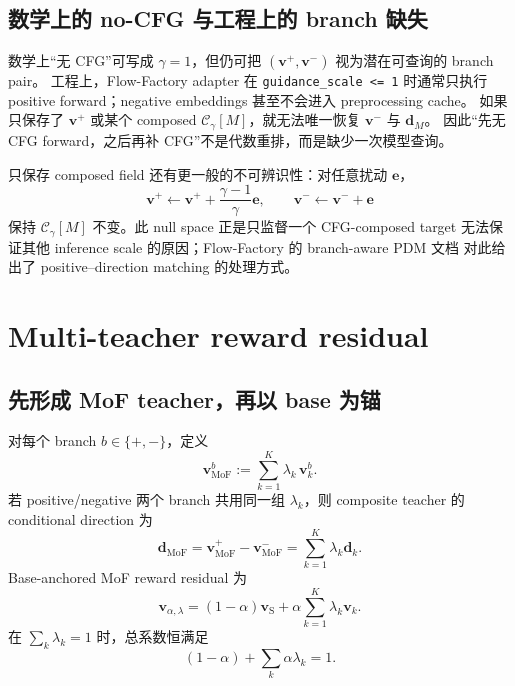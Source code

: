 \documentclass[11pt,a4paper]{article}
\newcommand{\C}{\mathcal{C}}
\newcommand{\MoF}{\mathrm{MoF}}
\newcommand{\vfield}{\bm{v}}
\newcommand{\student}{\mathrm{S}}
\newcommand{\pos}{+}
\newcommand{\negbranch}{-}
\theoremstyle{definition}
\theoremstyle{plain}
\begin{document}
\subsection{数学上的 no-CFG 与工程上的 branch 缺失}

\begin{tcolorbox}[
  colback=red!3,
  colframe=red!50!black,
  title=不可恢复性]
数学上``无 CFG''可写成 $\gamma=1$，但仍可把
$(\vfield^\pos,\vfield^\negbranch)$ 视为潜在可查询的 branch pair。
工程上，Flow-Factory adapter 在 \texttt{guidance\_scale <= 1} 时通常只执行
positive forward；negative embeddings 甚至不会进入 preprocessing cache。
如果只保存了 $\vfield^\pos$ 或某个 composed
$\C_\gamma[M]$，就无法唯一恢复 $\vfield^\negbranch$ 与 $\bm d_M$。
因此``先无 CFG forward，之后再补 CFG''不是代数重排，而是缺少一次模型查询。
\end{tcolorbox}

只保存 composed field 还有更一般的不可辨识性：对任意扰动 $\bm e$，
\begin{equation}
  \vfield^\pos\leftarrow
  \vfield^\pos+\frac{\gamma-1}{\gamma}\bm e,
  \qquad
  \vfield^\negbranch\leftarrow\vfield^\negbranch+\bm e
  \label{eq:branch-nullspace}
\end{equation}
保持 $\C_\gamma[M]$ 不变。此 null space 正是只监督一个 CFG-composed target
无法保证其他 inference scale 的原因；Flow-Factory 的 branch-aware PDM 文档
对此给出了 positive--direction matching 的处理方式。

\section{Multi-teacher reward residual}

\subsection{先形成 MoF teacher，再以 base 为锚}

对每个 branch $b\in\{\pos,\negbranch\}$，定义
\begin{equation}
  \vfield_{\MoF}^{b}
  :=
  \sum_{k=1}^{K}\lambda_k\,\vfield_k^{b}.
  \label{eq:mof-branches}
\end{equation}
若 positive/negative 两个 branch 共用同一组 $\lambda_k$，则 composite teacher
的 conditional direction 为
\begin{equation}
  \bm d_{\MoF}
  =
  \vfield_{\MoF}^{\pos}-\vfield_{\MoF}^{\negbranch}
  =
  \sum_{k=1}^{K}\lambda_k\bm d_k.
  \label{eq:mof-direction}
\end{equation}
Base-anchored MoF reward residual 为
\begin{equation}
\boxed{
  \vfield_{\alpha,\lambda}
  =
  (1-\alpha)\vfield_\student
  +\alpha\sum_{k=1}^{K}\lambda_k\vfield_k.
}
\label{eq:outer-mof-residual}
\end{equation}
在 $\sum_k\lambda_k=1$ 时，总系数恒满足
\begin{equation}
  (1-\alpha)+\sum_k\alpha\lambda_k=1.
  \label{eq:outer-sum-one}
\end{equation}
\end{document}
